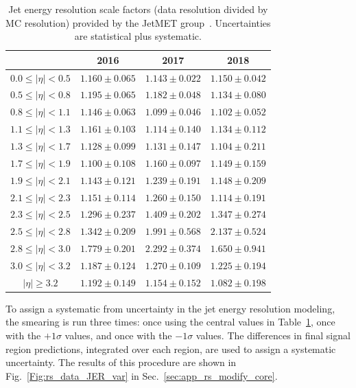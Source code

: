 \begin{table}[htp]
\caption{Jet energy resolution scale factors (data resolution divided by MC resolution) provided by the JetMET group~\cite{JetResolution}.
             Uncertainties are statistical plus systematic.}
\label{tab:jrt_jersfs}
\centering
\begin{tabular}{|c|ccc|}
\hline
 & 2016 & 2017 & 2018 \\ \hline
$0.0 \leq |\eta| < 0.5$ & $1.160\pm0.065$ & $1.143\pm0.022$ & $1.150\pm0.042$ \\
$0.5 \leq |\eta| < 0.8$ & $1.195\pm0.065$ & $1.182\pm0.048$ & $1.134\pm0.080$ \\
$0.8 \leq |\eta| < 1.1$ & $1.146\pm0.063$ & $1.099\pm0.046$ & $1.102\pm0.052$ \\
$1.1 \leq |\eta| < 1.3$ & $1.161\pm0.103$ & $1.114\pm0.140$ & $1.134\pm0.112$ \\
$1.3 \leq |\eta| < 1.7$ & $1.128\pm0.099$ & $1.131\pm0.147$ & $1.104\pm0.211$ \\
$1.7 \leq |\eta| < 1.9$ & $1.100\pm0.108$ & $1.160\pm0.097$ & $1.149\pm0.159$ \\
$1.9 \leq |\eta| < 2.1$ & $1.143\pm0.121$ & $1.239\pm0.191$ & $1.148\pm0.209$ \\
$2.1 \leq |\eta| < 2.3$ & $1.151\pm0.114$ & $1.260\pm0.150$ & $1.114\pm0.191$ \\
$2.3 \leq |\eta| < 2.5$ & $1.296\pm0.237$ & $1.409\pm0.202$ & $1.347\pm0.274$ \\
$2.5 \leq |\eta| < 2.8$ & $1.342\pm0.209$ & $1.991\pm0.568$ & $2.137\pm0.524$ \\
$2.8 \leq |\eta| < 3.0$ & $1.779\pm0.201$ & $2.292\pm0.374$ & $1.650\pm0.941$ \\
$3.0 \leq |\eta| < 3.2$ & $1.187\pm0.124$ & $1.270\pm0.109$ & $1.225\pm0.194$ \\
$|\eta| \geq 3.2$       & $1.192\pm0.149$ & $1.154\pm0.152$ & $1.082\pm0.198$ \\
\hline
\end{tabular}
\end{table}

To assign a systematic from uncertainty in the jet energy resolution modeling, the smearing is run three times:
once using the central values in Table~\ref{tab:jrt_jersfs}, once with the $+1\sigma$ values,
and once with the $-1\sigma$ values. The differences in final signal region predictions,
integrated over each \Ht region, are used to assign a systematic uncertainty. The results of this
procedure are shown in Fig.~\ref{Fig:rs_data_JER_var} in Sec.~\ref{sec:app_rs_modify_core}.

